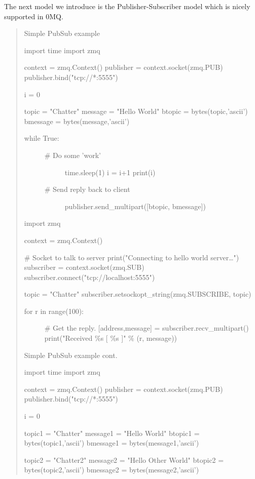 The next model we introduce is the Publisher-Subscriber model which is
nicely supported in 0MQ.

\begin{quote}
Simple PubSub example

import time import zmq

context = zmq.Context() publisher = context.socket(zmq.PUB)
publisher.bind("tcp://*:5555")

i = 0

topic = "Chatter" message = "Hello World" btopic = bytes(topic,'ascii')
bmessage = bytes(message,'ascii')

\begin{description}
\item[while True:]
\begin{description}
\item[\# Do some 'work']
time.sleep(1) i = i+1 print(i)
\item[\# Send reply back to client]
publisher.send\_multipart({[}btopic, bmessage{]})
\end{description}
\end{description}

import zmq

context = zmq.Context()

\# Socket to talk to server print("Connecting to hello world
server\ldots") subscriber = context.socket(zmq.SUB)
subscriber.connect("tcp://localhost:5555")

topic = "Chatter" subscriber.setsockopt\_string(zmq.SUBSCRIBE, topic)

\begin{description}
\item[for r in range(100):]
\# Get the reply. {[}address,message{]} = subscriber.recv\_multipart()
print("Received \%s {[} \%s {]}" \% (r, message))
\end{description}

Simple PubSub example cont.

import time import zmq

context = zmq.Context() publisher = context.socket(zmq.PUB)
publisher.bind("tcp://*:5555")

i = 0

topic1 = "Chatter" message1 = "Hello World" btopic1 =
bytes(topic1,'ascii') bmessage1 = bytes(message1,'ascii')

topic2 = "Chatter2" message2 = "Hello Other World" btopic2 =
bytes(topic2,'ascii') bmessage2 = bytes(message2,'ascii')


\end{quote}
